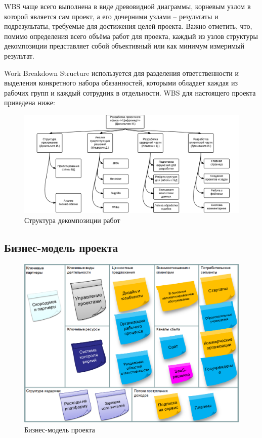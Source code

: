 \documentclass[a4paper, 14pt]{extarticle}
\begin{document}
WBS чаще всего выполнена в виде древовидной диаграммы, корневым узлом в которой является сам проект, а его дочерними узлами -- результаты и подрезультаты, требуемые для достижения целей проекта. Важно отметить, что, помимо определения всего объёма работ для проекта, каждый из узлов структуры декомпозиции представляет собой объективный или как минимум измеримый результат.

Work Breakdown Structure используется для разделения ответственности и выделения конкретного набора обязанностей, которыми обладает каждая из рабочих групп и каждый сотрудник в отдельности. WBS для настоящего проекта приведена ниже:


\vspace{1em}

\begin{figure}[!htb]
  \centering
    \includegraphics[scale=0.25]{../shared_images/wbs.png}
   \caption{Структура декомпозиции работ}
    \label{fig:start}
\end{figure}
\newpage


\subsection{Бизнес-модель проекта}

\begin{figure}[!htb]
  \centering
    \includegraphics[scale=0.6]{../shared_images/business-model.png}
   \caption{Бизнес-модель проекта}
    \label{fig:start}
\end{figure}
  
\end{document}
